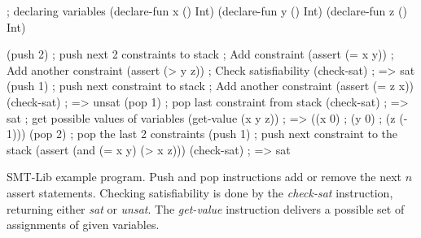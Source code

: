 \begin{program}[h!]
	\begin{LispCode}
		; declaring variables
		(declare-fun x () Int)
		(declare-fun y () Int)
		(declare-fun z () Int)
		
		(push 2) ; push next 2 constraints to stack
		; Add constraint
		(assert (= x y))
		; Add another constraint
		(assert (> y z))
		; Check satisfiability
		(check-sat)
		; => sat
		(push 1) ; push next constraint to stack
		; Add another constraint
		(assert (= z x))
		(check-sat)
		; => unsat
		(pop 1) ; pop last constraint from stack
		(check-sat)
		; => sat
		; get possible values of variables
		(get-value (x y z))
		; => ((x 0)
		;     (y 0)
		;     (z (- 1)))
		(pop 2) ; pop the last 2 constraints
		(push 1) ; push next constraint to the stack
		(assert (and (= x y) (> x z)))
		(check-sat)
		; => sat\end{LispCode}
	\caption{SMT-Lib example program. Push and pop instructions add or remove the next $n$ assert statements. Checking satisfiability is done by the \emph{check-sat} instruction, returning either \emph{sat} or \emph{unsat}. The \emph{get-value} instruction delivers a possible set of assignments of given variables. }
	\label{code:smt-lib}
\end{program}



